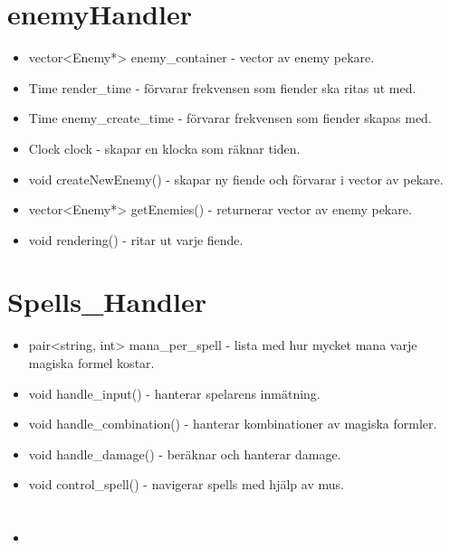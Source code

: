 \documentclass{TDP005mall}
\begin{document}
\section{enemyHandler}

\begin{itemize}

\item vector<Enemy*> enemy\_container - vector av enemy pekare.
\item Time render\_time - förvarar frekvensen som fiender ska ritas ut med.
\item Time enemy\_create\_time - förvarar frekvensen som fiender skapas med.
\item Clock clock - skapar en klocka som räknar tiden.
  
\item void createNewEnemy() - skapar ny fiende och förvarar i vector av pekare.
\item vector<Enemy*> getEnemies() - returnerar vector av enemy pekare.
\item void rendering() - ritar ut varje fiende.
  
\end{itemize}


\section{Spells\_Handler}

\begin{itemize}

\item pair<string, int> mana\_per\_spell - lista med hur mycket mana varje magiska formel kostar. 
\item void handle\_input() - hanterar spelarens inmätning. 
\item void handle\_combination() - hanterar kombinationer av magiska     formler. 
\item void handle\_damage() - beräknar och hanterar damage. 
\item void control\_spell() - navigerar spells med hjälp av mus. 
  
\end{itemize}


\section{}

\begin{itemize}
  
\item
  
\end{itemize}
\end{document}
